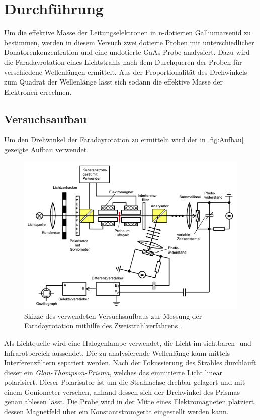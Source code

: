 \section{Durchführung}
\label{sec:Durchführung}
Um die effektive Masse der Leitungselektronen in n-dotierten Galliumarsenid zu bestimmen, werden in diesem Versuch zwei dotierte Proben mit unterschiedlicher 
Donatorenkonzentration und eine undotierte GaAs Probe analysiert. Dazu wird die Faradayrotation eines Lichtstrahls nach dem Durchqueren der Proben für 
verschiedene Wellenlängen ermittelt. Aus der Proportionalität des Drehwinkels zum Quadrat der Wellenlänge lässt sich sodann die effektive Masse der Elektronen
errechnen.

\subsection{Versuchsaufbau}
\label{subsec:Versuchsaufbau}
Um den Drehwinkel der Faradayrotation zu ermitteln wird der in \autoref{fig:Aufbau} gezeigte Aufbau verwendet.
\begin{figure}
    \centering
    \includegraphics[width=.8\textwidth]{content/pics/Aufbau.png}
    \caption{Skizze des verwendeten Versuchsaufbaus zur Messung der Faradayrotation mithilfe des Zweistrahlverfahrens \cite{V46}.}
    \label{fig:Aufbau}
\end{figure}
Als Lichtquelle wird eine Halogenlampe verwendet, die Licht im sichtbaren- und Infrarotbereich aussendet. Die zu analysierende Wellenlänge kann mittels 
Interferenzfiltern separiert werden. Nach der Fokussierung des Strahles durchläuft dieser ein \textit{Glan-Thompson-Prisma}, welches das emmitierte Licht 
linear polarisiert. Dieser Polarisator ist um die Strahlachse drehbar gelagert und mit einem Goniometer versehen, anhand dessen sich der Drehwinkel des Prismas 
genau ablesen lässt. Die Probe wird in der Mitte eines Elektromagneten platziert, dessen Magnetfeld über ein Konstantstromgerät eingestellt werden kann. 
